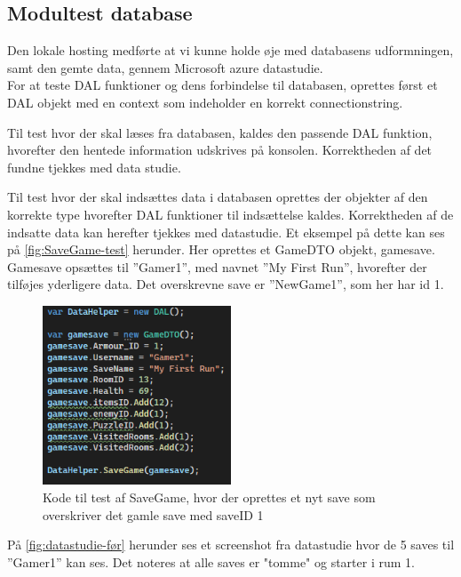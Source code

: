 \subsection{Modultest database}
\label{ssec: Modultest database}
Den lokale hosting medførte at vi kunne holde øje med databasens udformningen, samt den gemte data, gennem Microsoft azure datastudie.\cite{Data-Studie}\\

\noindent For at teste DAL funktioner og dens forbindelse til databasen, oprettes først et DAL objekt med en context som indeholder en korrekt connectionstring.

\noindent Til test hvor der skal læses fra databasen, kaldes den passende DAL funktion, hvorefter den hentede information udskrives på konsolen. Korrektheden af det fundne tjekkes med data studie.

\noindent Til test hvor der skal indsættes data i databasen oprettes der objekter af den korrekte type hvorefter DAL funktioner til indsættelse kaldes. Korrektheden af de indsatte data kan herefter tjekkes med datastudie.
Et eksempel på dette kan ses på \autoref{fig:SaveGame-test} herunder.
Her oprettes et GameDTO objekt, gamesave.\\
Gamesave opsættes til ”Gamer1”, med navnet ”My First Run”, hvorefter der tilføjes yderligere data. Det overskrevne save er ”NewGame1”, som her har id 1.

\begin{figure}[H]
\centering
\includegraphics[width = 0.5\textwidth]{02-Body/Images/DAL-Database/DB-Test.png}
\caption{Kode til test af SaveGame, hvor der oprettes et nyt save som overskriver det gamle save med saveID 1}
\label{fig:SaveGame-test}
\end{figure}

\noindent På \autoref{fig:datastudie-før} herunder ses et screenshot fra datastudie hvor de 5 saves til ”Gamer1” kan ses.
Det noteres at alle saves er "tomme" og starter i rum 1.

